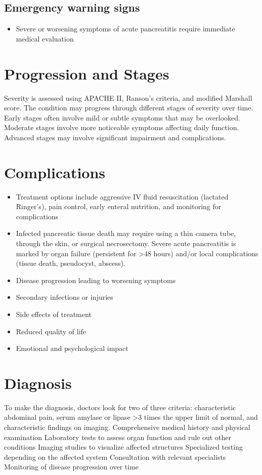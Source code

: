 \subsection{Emergency warning signs}
\begin{itemize}[noitemsep]
  \item Severe or worsening symptoms of acute pancreatitis require immediate medical evaluation
\end{itemize}
\section{Progression and Stages}
Severity is assessed using APACHE II, Ranson's criteria, and modified Marshall score. The condition may progress through different stages of severity over time. Early stages often involve mild or subtle symptoms that may be overlooked. Moderate stages involve more noticeable symptoms affecting daily function. Advanced stages may involve significant impairment and complications.
\section{Complications}
\begin{itemize}[noitemsep]
  \item Treatment options include aggressive IV fluid resuscitation (lactated Ringer's), pain control, early enteral nutrition, and monitoring for complications
  \item Infected pancreatic tissue death may require using a thin camera tube, through the skin, or surgical necrosectomy. Severe acute pancreatitis is marked by organ failure (persistent for >48 hours) and/or local complications (tissue death, pseudocyst, abscess).
  \item Disease progression leading to worsening symptoms
  \item Secondary infections or injuries
  \item Side effects of treatment
  \item Reduced quality of life
  \item Emotional and psychological impact
\end{itemize}
\section{Diagnosis}
To make the diagnosis, doctors look for two of three criteria: characteristic abdominal pain, serum amylase or lipase >3 times the upper limit of normal, and characteristic findings on imaging. Comprehensive medical history and physical examination Laboratory tests to assess organ function and rule out other conditions Imaging studies to visualize affected structures Specialized testing depending on the affected system Consultation with relevant specialists Monitoring of disease progression over time

